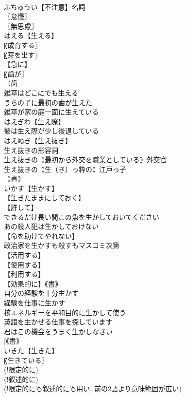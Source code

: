 \documentclass[8pt]{extreport}
\begin{document}
\begin{CJK}{UTF8}{min}
\\	ふちゅうい【不注意】名詞
\\	〖怠慢〗
\\	〖無思慮〗
\\	はえる【生える】
\\	〖成育する〗
\\	〖芽を出す〗
\\	【急に】
\\	〖歯が〗
\\	（歯
\\	雑草はどこにでも生える
\\	うちの子に最初の歯が生えた
\\	雑草が家の庭一面に生えている
\\	はえぎわ【生え際】
\\	彼は生え際が少し後退している
\\	はえぬき【生え抜き】
\\	生え抜きの形容詞
\\	生え抜きの｟最初から外交を職業としている｠外交官
\\	生え抜きの｟生（き）っ粋の｠江戸っ子
\\	｟書｠
\\	いかす【生かす】
\\	【生きたままにしておく】
\\	【許して】
\\	できるだけ長い間この魚を生かしておいてください
\\	あの殺人犯は生かしておけない
\\	【命を助けてやれない】
\\	政治家を生かすも殺すもマスコミ次第
\\	【活用する】
\\	【使用する】
\\	【利用する】
\\	【効果的に】｟書｠
\\	自分の経験を十分生かす
\\	経験を仕事に生かす
\\	核エネルギーを平和目的に生かして使う
\\	英語を生かせる仕事を探しています
\\	君はこの機会をうまく生かしなさい
\\	[｟書｠ 
\\	いきた【生きた】
\\	〖生きている〗
\\	(!限定的に) 
\\	(!叙述的に) 
\\	(!限定的にも叙述的にも用い, 前の2語より意味範囲が広い) 

\end{CJK}
\end{document}
